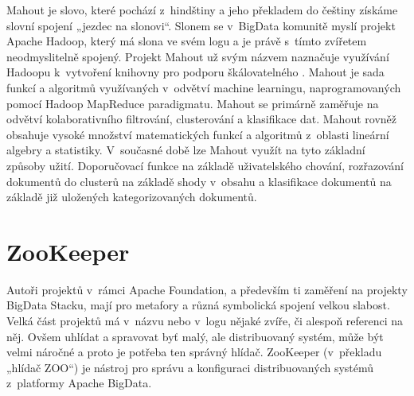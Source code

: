 Mahout je slovo, které pochází z~hindštiny a jeho překladem do češtiny získáme slovní spojení „jezdec na slonovi“. Slonem se v~BigData komunitě myslí projekt Apache Hadoop, který má slona ve svém logu a je právě s~tímto zvířetem neodmyslitelně spojený. Projekt Mahout už svým názvem naznačuje využívání Hadoopu k~vytvoření knihovny pro podporu škálovatelného . Mahout je sada funkcí a algoritmů využívaných v~odvětví machine learningu, naprogramovaných pomocí Hadoop MapReduce paradigmatu. Mahout se primárně zaměřuje na odvětví kolaborativního filtrování, clusterování a klasifikace dat. Mahout rovněž obsahuje vysoké množství matematických funkcí a algoritmů z~oblasti lineární algebry a statistiky. V~současné době lze Mahout využít na tyto základní způsoby užití. Doporučovací funkce na základě uživatelského chování, rozřazování dokumentů do clusterů na základě shody v~obsahu a klasifikace dokumentů na základě již uložených kategorizovaných dokumentů. %

\section {ZooKeeper}

Autoři projektů v~rámci Apache Foundation, a především ti zaměření na projekty BigData Stacku, mají pro metafory a různá symbolická spojení velkou slabost. Velká část projektů má v~názvu nebo v~logu nějaké zvíře, či alespoň referenci na něj. Ovšem uhlídat a spravovat byť malý, ale distribuovaný systém, může být velmi náročné a proto je potřeba ten správný hlídač. ZooKeeper (v~překladu „hlídač ZOO“) je nástroj pro správu a konfiguraci distribuovaných systémů z~platformy Apache BigData. 

